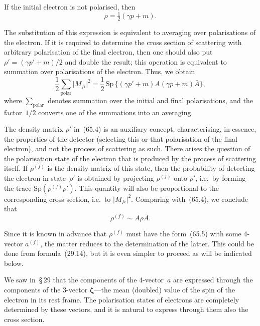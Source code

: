 If the initial electron is not polarised, then
\begin{equation}
\rho = \tfrac{1}{2}(\gamma p + m).
\tag{65.6}
\end{equation}

The substitution of this expression is equivalent to averaging over polarisations of the electron. If it is required to determine the cross section of scattering with arbitrary polarisation of the final electron, then one should also put $\rho' = (\gamma p' + m)/2$ and double the result; this operation is equivalent to summation over polarisations of the electron. Thus, we obtain
\begin{equation}
\frac{1}{2}\sum_\mathrm{polar}|M_{fi}|^2 = \frac{1}{2}\,\mathrm{Sp}\,\{(\gamma p' + m)A(\gamma p + m)\bar{A}\},
\tag{65.7}
\end{equation}
where $\sum_\mathrm{polar}$ denotes summation over the initial and final polarisations, and the factor~$1/2$ converts one of the summations into an averaging.

The density matrix $\rho'$ in~(65.4) is an auxiliary concept, characterising, in essence, the properties of the detector (selecting this or that polarisation of the final electron), and not the process of scattering as such. There arises the question of the polarisation state of the electron that is produced by the process of scattering itself. If $\rho^{(f)}$ is the density matrix of this state, then the probability of detecting the electron in state~$\rho'$ is obtained by projecting $\rho^{(f)}$ onto $\rho'$, i.e.\ by forming the trace $\mathrm{Sp}(\rho^{(f)}\rho')$. This quantity will also be proportional to the corresponding cross section, i.e.\ to $|M_{fi}|^2$. Comparing with~(65.4), we conclude that
\begin{equation}
\rho^{(f)} \sim A\rho\bar{A}.
\tag{65.8}
\end{equation}

Since it is known in advance that $\rho^{(f)}$ must have the form~(65.5) with some 4-vector $a^{(f)}$, the matter reduces to the determination of the latter. This could be done from formula~(29.14), but it is even simpler to proceed as will be indicated below.

We saw in~\S\,29 that the components of the 4-vector~$a$ are expressed through the components of the 3-vector $\boldsymbol{\zeta}$---the mean (doubled) value of the spin of the electron in its rest frame. The polarisation states of electrons are completely determined by these vectors, and it is natural to express through them also the cross section.


